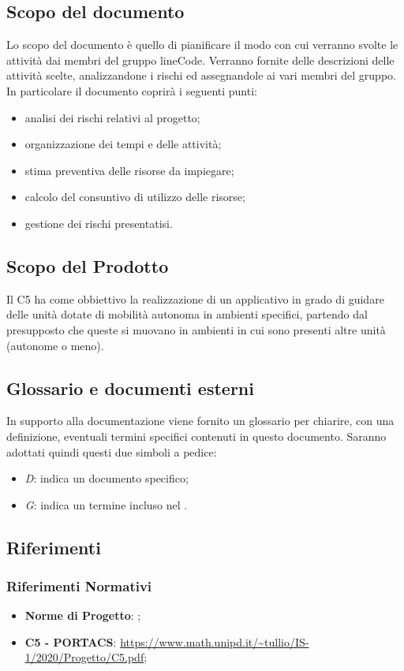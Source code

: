 \subsection{Scopo del documento}
	Lo scopo del documento è quello di pianificare il modo con cui verranno svolte le attività dai membri del gruppo lineCode. Verranno fornite delle descrizioni delle attività scelte, analizzandone i rischi ed assegnandole ai vari membri del gruppo.
	In particolare il documento coprirà i seguenti punti:
	\begin{itemize}
		\item analisi dei rischi relativi al progetto;
		\item organizzazione dei tempi e delle attività;
		\item stima preventiva delle risorse da impiegare;
		\item calcolo del consuntivo di utilizzo delle risorse;
		\item gestione dei rischi presentatisi.
	\end{itemize}

\subsection{Scopo del Prodotto}
	Il  C5 ha come obbiettivo la realizzazione di un applicativo  in grado di guidare delle unità dotate di mobilità autonoma in ambienti specifici, partendo dal presupposto che queste si muovano in ambienti in cui sono presenti altre unità (autonome o meno).

\subsection{Glossario e documenti esterni}
	In supporto alla documentazione viene fornito un glossario per chiarire, con una definizione, eventuali termini specifici contenuti in questo documento.
	Saranno adottati quindi questi due simboli a pedice:
	\begin{itemize}
		\item \textit{D}: indica un documento specifico;
		\item \textit{G}: indica un termine incluso nel .
	\end{itemize}

\subsection{Riferimenti}
	\subsubsection{Riferimenti Normativi}
	\begin{itemize}
		\item \textbf{Norme di Progetto}: ;
		\item \textbf{{ C5 - PORTACS}}: \url{https://www.math.unipd.it/~tullio/IS-1/2020/Progetto/C5.pdf};
	\end{itemize}
